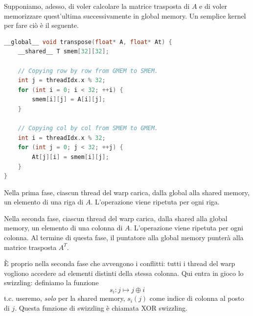 Supponiamo, adesso, di voler calcolare la matrice trasposta di \(A\) e di voler memorizzare quest'ultima successivamente in global memory.
Un semplice kernel per fare ciò è il seguente.
\begin{lstlisting}[language=C++, caption={Il kernel viene lanciato con una griglia di dimensioni \(32\cdot 32\times 1\times 1\). Si assume che il puntatore \code{At} punti ad una regione già allocata.}]
__global__ void transpose(float* A, float* At) {
    __shared__ T smem[32][32];
     
    // Copying row by row from GMEM to SMEM.
    int j = threadIdx.x % 32;
    for (int i = 0; i < 32; ++i) {
        smem[i][j] = A[i][j];
    }
     
    // Copying col by col from SMEM to GMEM.
    int i = threadIdx.x % 32;
    for (int j = 0; j < 32; ++j) {
        At[j][i] = smem[i][j];
    }	
}
\end{lstlisting}
Nella prima fase, ciascun thread del warp carica, dalla global alla shared memory, un elemento di una riga di \(A\).
L'operazione viene ripetuta per ogni riga.

Nella seconda fase, ciascun thread del warp carica, dalla shared alla global memory, un elemento di una colonna di \(A\). L'operazione viene ripetuta per ogni colonna.
Al termine di questa fase, il puntatore  alla global memory punterà alla matrice trasposta \(A^T\).

È proprio nella seconda fase che avvengono i conflitti: tutti i thread del warp vogliono accedere ad elementi distinti della stessa colonna.
Qui entra in gioco lo swizzling: definiamo la funzione
\[ s_i: j \mapsto j \oplus i \]
t.c. useremo, \emph{solo} per la shared memory, \(s_i(j)\) come indice di colonna al posto di \(j\).
Questa funzione di swizzling è chiamata XOR swizzling.

